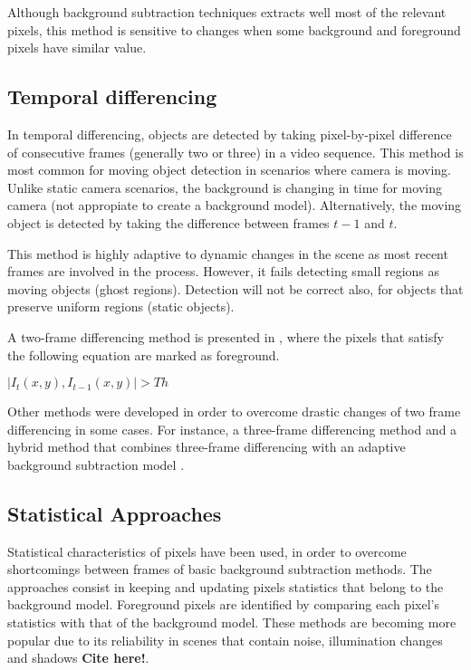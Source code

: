 Although background subtraction techniques extracts well most of the relevant pixels, this method is sensitive to changes when some background and foreground pixels have similar value.

\subsection{Temporal differencing}

In temporal differencing, objects are detected by taking pixel-by-pixel difference of consecutive frames (generally two or three) in a video sequence. This method is most common for moving object detection in scenarios where camera is moving. Unlike static camera scenarios, the background is changing in time for moving camera (not appropiate to create a background model). Alternatively, the moving object is detected by taking the difference between frames $t - 1$ and $t$.

This method is highly adaptive to dynamic changes in the scene as most recent frames are involved in the process. However, it fails detecting small regions as moving objects (ghost regions). Detection will not be correct also, for objects that preserve uniform regions (static objects).

A two-frame differencing method is presented in \cite{Lipton1998a}, where the pixels that satisfy the following equation are marked as foreground.\\
\centerline{$|I_t(x,y), I_{t-1}(x,y)|>Th$}

Other methods were developed in order to overcome drastic changes of two frame differencing in some cases. For instance, a three-frame differencing method \cite{Wang2003} and a hybrid method that combines three-frame differencing with an adaptive background subtraction model \cite{Collins2000}.

\subsection{Statistical Approaches}

Statistical characteristics of pixels have been used, in order to overcome shortcomings between frames of basic background subtraction methods. The approaches consist in keeping and updating pixels statistics that belong to the background model. Foreground pixels are identified by comparing each pixel's statistics with that of the background model. These methods are becoming more popular due to its reliability in scenes that contain noise, illumination changes and shadows \textbf{Cite here!}.

